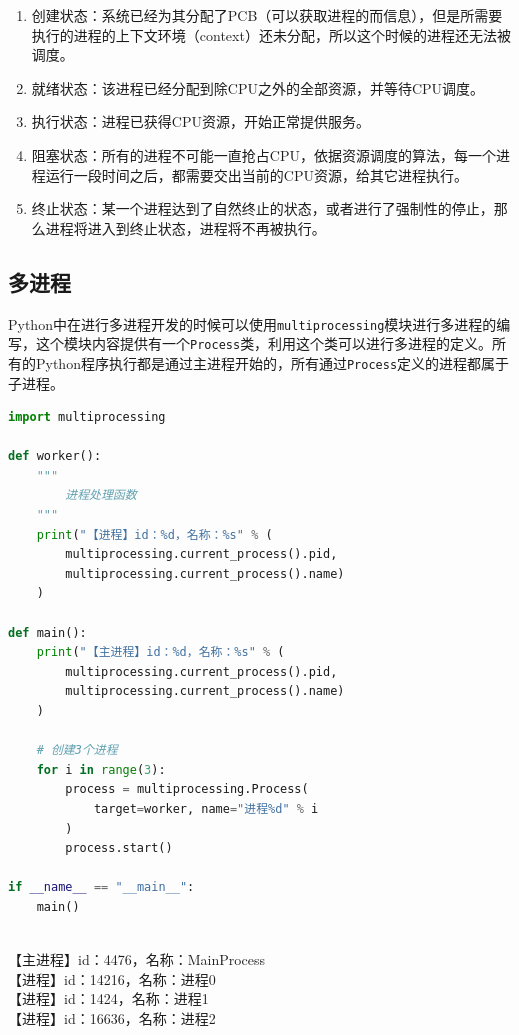 \begin{enumerate}
	\item 创建状态：系统已经为其分配了PCB（可以获取进程的而信息），但是所需要执行的进程的上下文环境（context）还未分配，所以这个时候的进程还无法被调度。

	\item 就绪状态：该进程已经分配到除CPU之外的全部资源，并等待CPU调度。

	\item 执行状态：进程已获得CPU资源，开始正常提供服务。

	\item 阻塞状态：所有的进程不可能一直抢占CPU，依据资源调度的算法，每一个进程运行一段时间之后，都需要交出当前的CPU资源，给其它进程执行。

	\item 终止状态：某一个进程达到了自然终止的状态，或者进行了强制性的停止，那么进程将进入到终止状态，进程将不再被执行。
\end{enumerate}

\subsection{多进程}

Python中在进行多进程开发的时候可以使用\lstinline|multiprocessing|模块进行多进程的编写，这个模块内容提供有一个\lstinline|Process|类，利用这个类可以进行多进程的定义。所有的Python程序执行都是通过主进程开始的，所有通过\lstinline|Process|定义的进程都属于子进程。

\begin{lstlisting}[language=Python, title=创建多进程]
import multiprocessing

def worker():
	"""
		进程处理函数
	"""
	print("【进程】id：%d，名称：%s" % (
		multiprocessing.current_process().pid,
		multiprocessing.current_process().name)
	)

def main():
	print("【主进程】id：%d，名称：%s" % (
		multiprocessing.current_process().pid,
		multiprocessing.current_process().name)
	)

	# 创建3个进程
	for i in range(3):
		process = multiprocessing.Process(
			target=worker, name="进程%d" % i
		)
		process.start()

if __name__ == "__main__":
	main()
\end{lstlisting}

\begin{tcolorbox}
	 \\
	【主进程】id：4476，名称：MainProcess \\
	【进程】id：14216，名称：进程0 \\
	【进程】id：1424，名称：进程1 \\
	【进程】id：16636，名称：进程2
\end{tcolorbox}

